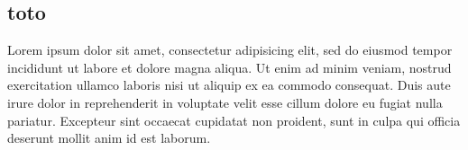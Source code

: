 \documentclass{article}
\begin{document}
\begin{pages}
\begin{Rightside}
\pstart

\leavevmode\section{toto}
\pend
\pstart
\begin{ledgroup}

Lorem ipsum dolor sit amet, consectetur adipisicing elit, sed do eiusmod tempor incididunt ut labore et dolore magna aliqua. Ut enim ad minim veniam, nostrud exercitation ullamco laboris nisi ut aliquip ex ea commodo consequat. Duis aute irure dolor in reprehenderit in voluptate velit esse cillum dolore eu fugiat nulla pariatur. Excepteur sint occaecat cupidatat non proident, sunt in culpa qui officia deserunt mollit anim id est laborum.
\end{ledgroup}
\pend
\endnumbering
\end{Rightside}
\Pages
\end{pages}
\end{document}
